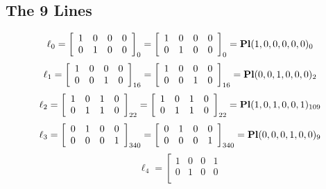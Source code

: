 \documentclass{article}
\begin{document}
{\subsection*{The 9 Lines}
$$
\ell_{0} = 
\left[
\begin{array}{*{4}{r}}
1 & 0 & 0 & 0\\
0 & 1 & 0 & 0\\
\end{array}
\right]
_{0}
=
\left[
\begin{array}{*{4}c}
1  & 0  & 0  & 0\\
0  & 1  & 0  & 0\\
\end{array}
\right]_{0}
={\rm\bf Pl}(1,0,0,0,0,0 )_{0}$$
$$
\ell_{1} = 
\left[
\begin{array}{*{4}{r}}
1 & 0 & 0 & 0\\
0 & 0 & 1 & 0\\
\end{array}
\right]
_{16}
=
\left[
\begin{array}{*{4}c}
1  & 0  & 0  & 0\\
0  & 0  & 1  & 0\\
\end{array}
\right]_{16}
={\rm\bf Pl}(0,0,1,0,0,0 )_{2}$$
$$
\ell_{2} = 
\left[
\begin{array}{*{4}{r}}
1 & 0 & 1 & 0\\
0 & 1 & 1 & 0\\
\end{array}
\right]
_{22}
=
\left[
\begin{array}{*{4}c}
1  & 0  & 1  & 0\\
0  & 1  & 1  & 0\\
\end{array}
\right]_{22}
={\rm\bf Pl}(1,0,1,0,0,1 )_{109}$$
$$
\ell_{3} = 
\left[
\begin{array}{*{4}{r}}
0 & 1 & 0 & 0\\
0 & 0 & 0 & 1\\
\end{array}
\right]
_{340}
=
\left[
\begin{array}{*{4}c}
0  & 1  & 0  & 0\\
0  & 0  & 0  & 1\\
\end{array}
\right]_{340}
={\rm\bf Pl}(0,0,0,1,0,0 )_{9}$$
$$
\ell_{4} = 
\left[
\begin{array}{*{4}{r}}
1 & 0 & 0 & 1\\
0 & 1 & 0 & 0\\
\end{array}
$$}
\end{document}
